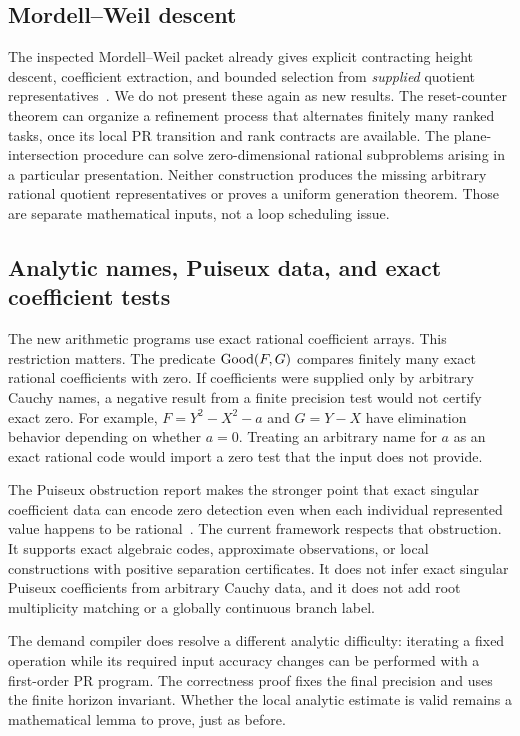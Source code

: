 \subsection{Mordell--Weil descent}

The inspected Mordell--Weil packet already gives explicit contracting
height descent, coefficient extraction, and bounded selection from
\emph{supplied} quotient representatives~\cite{repo-mw}. We do not
present these again as new results. The reset-counter theorem can
organize a refinement process that alternates finitely many ranked
tasks, once its local PR transition and rank contracts are available.
The plane-intersection procedure can solve zero-dimensional rational
subproblems arising in a particular presentation. Neither construction
produces the missing arbitrary rational quotient representatives or
proves a uniform generation theorem. Those are separate mathematical
inputs, not a loop scheduling issue.

\subsection{Analytic names, Puiseux data, and exact coefficient tests}

The new arithmetic programs use exact rational coefficient arrays.
This restriction matters. The predicate \(\operatorname{Good}(F,G)\) compares
finitely many exact rational coefficients with zero. If coefficients
were supplied only by arbitrary Cauchy names, a negative result from
a finite precision test would not certify exact zero. For example,
\(F=Y^2-X^2-a\) and \(G=Y-X\) have elimination behavior depending
on whether \(a=0\). Treating an arbitrary name for \(a\) as an
exact rational code would import a zero test that the input does not
provide.

The Puiseux obstruction report makes the stronger point that exact
singular coefficient data can encode zero detection even when each
individual represented value happens to be rational~\cite{repo-puiseux}.
The current framework respects that obstruction. It supports exact
algebraic codes, approximate observations, or local constructions with
positive separation certificates. It does not infer exact singular
Puiseux coefficients from arbitrary Cauchy data, and it does not add
root multiplicity matching or a globally continuous branch label.

The demand compiler does resolve a different analytic difficulty:
iterating a fixed operation while its required input accuracy changes
can be performed with a first-order PR program. The correctness proof
fixes the final precision and uses the finite horizon invariant.
Whether the local analytic estimate is valid remains a mathematical
lemma to prove, just as before.

